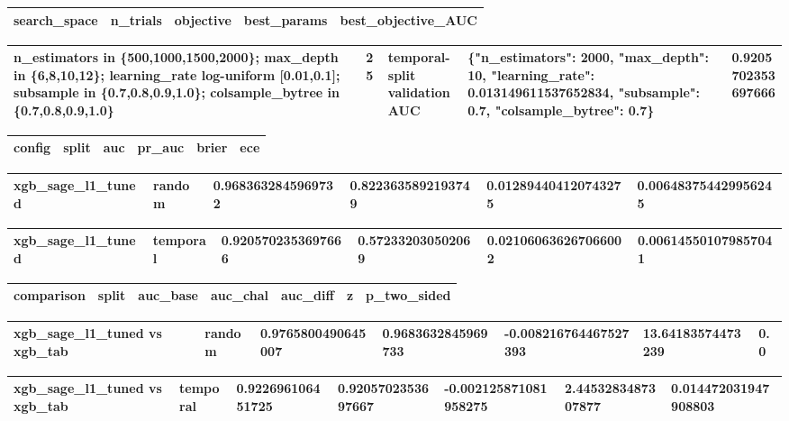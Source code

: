\begin{tabular}{lllll}
\toprule
search\_space & n\_trials & objective & best\_params & best\_objective\_AUC \\
\midrule
\bottomrule
\end{tabular}


\begin{tabular}{lllll}
\toprule
n\_estimators in \{500,1000,1500,2000\}; max\_depth in \{6,8,10,12\}; learning\_rate log-uniform [0.01,0.1]; subsample in \{0.7,0.8,0.9,1.0\}; colsample\_bytree in \{0.7,0.8,0.9,1.0\} & 25 & temporal-split validation AUC & \{"n\_estimators": 2000, "max\_depth": 10, "learning\_rate": 0.013149611537652834, "subsample": 0.7, "colsample\_bytree": 0.7\} & 0.9205702353697666 \\
\midrule
\bottomrule
\end{tabular}


\begin{tabular}{llllll}
\toprule
config & split & auc & pr\_auc & brier & ece \\
\midrule
\bottomrule
\end{tabular}


\begin{tabular}{llllll}
\toprule
xgb\_sage\_l1\_tuned & random & 0.9683632845969732 & 0.8223635892193749 & 0.012894404120743275 & 0.006483754429956245 \\
\midrule
\bottomrule
\end{tabular}


\begin{tabular}{llllll}
\toprule
xgb\_sage\_l1\_tuned & temporal & 0.9205702353697666 & 0.572332030502069 & 0.021060636267066002 & 0.006145501079857041 \\
\midrule
\bottomrule
\end{tabular}


\begin{tabular}{lllllll}
\toprule
comparison & split & auc\_base & auc\_chal & auc\_diff & z & p\_two\_sided \\
\midrule
\bottomrule
\end{tabular}


\begin{tabular}{lllllll}
\toprule
xgb\_sage\_l1\_tuned vs xgb\_tab & random & 0.9765800490645007 & 0.9683632845969733 & -0.008216764467527393 & 13.64183574473239 & 0.0 \\
\midrule
\bottomrule
\end{tabular}


\begin{tabular}{lllllll}
\toprule
xgb\_sage\_l1\_tuned vs xgb\_tab & temporal & 0.922696106451725 & 0.9205702353697667 & -0.002125871081958275 & 2.4453283487307877 & 0.014472031947908803 \\
\midrule
\bottomrule
\end{tabular}
